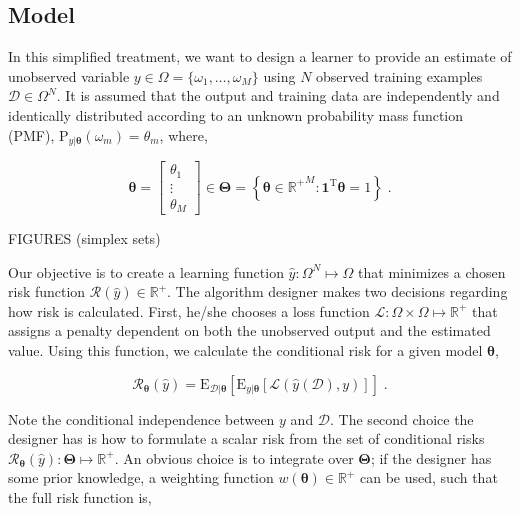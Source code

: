 \documentclass[12pt]{article}
\begin{document}
\subsection{Model}

In this simplified treatment, we want to design a learner to provide an estimate of unobserved variable $y \in \Omega = \{ \omega_1, \ldots, \omega_M \}$ using $N$ observed training examples $\mathcal{D} \in \Omega^N$. It is assumed that the output and training data are independently and identically distributed according to an unknown probability mass function (PMF), $\text{P}_{y|\bm{\theta}} \left(\omega_{m}\right) = \theta_m$, where,

\begin{equation}
\bm{\theta} = \left[ \begin{array}{c} \theta_1 \\ \vdots \\ \theta_M \end{array} \right]
\in \bm{\Theta} = \left\{ \bm{\theta} \in {\mathbb{R}^+}^M: \bm{1}^\text{T}\bm{\theta} = 1 \right\} \;. 
\end{equation}

FIGURES (simplex sets)

Our objective is to create a learning function $\hat{y}: \Omega^N \mapsto \Omega$ that minimizes a chosen risk function $\mathcal{R}(\hat{y}) \in \mathbb{R}^+$.  The algorithm designer makes two decisions regarding how risk is calculated. First, he/she chooses a loss function $\mathcal{L}: \Omega \times \Omega \mapsto \mathbb{R}^+$ that assigns a penalty dependent on both the unobserved output and the estimated value. Using this function, we calculate the conditional risk for a given model $\bm{\theta}$,

\begin{equation}
\mathcal{R}_{\bm{\theta}}(\hat{y}) = \text{E}_{\mathcal{D}|\bm{\theta}} \left[ \text{E}_{y|\bm{\theta}} \left[ \mathcal{L}(\hat{y}(\mathcal{D}),y) \right] \right] \;.
\end{equation}

Note the conditional independence between $y$ and $\mathcal{D}$. The second choice the designer has is how to formulate a scalar risk from the set of conditional risks $\mathcal{R}_{\bm{\theta}}(\hat{y}): \bm{\Theta} \mapsto \mathbb{R}^+$. An obvious choice is to integrate over $\bm{\Theta}$; if the designer has some prior knowledge, a weighting function $w(\bm{\theta}) \in \mathbb{R}^+$ can be used, such that the full risk function is,
\end{document}
